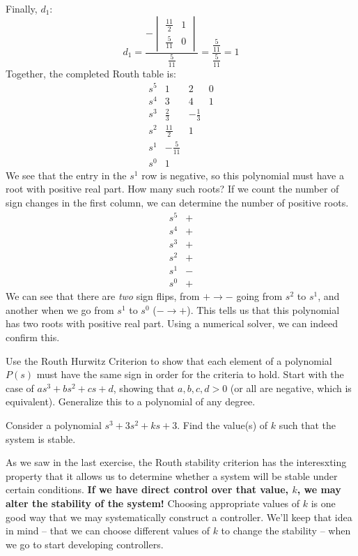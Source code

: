 \begin{example}
    Finally, $d_1$:
         $$d_1=\frac{-\begin{vmatrix}
        \frac{11}{2}&1\\\frac{5}{11}&0
    \end{vmatrix}}{\frac{5}{11}}=\frac{\frac{5}{11}}{\frac{5}{11}}=1$$
Together, the completed Routh table is:
    $$
    \begin{array}{lccc}
         s^5&1&2&0  \\
         s^4&3&4&1\\
         s^3&\frac{2}{3}&-\frac{1}{3}\\
         s^2&\frac{11}{2}&1\\
         s^1&-\frac{5}{11}\\
         s^0&1
    \end{array}
    $$
We see that the entry in the $s^1$ row is negative, so this polynomial must have a root with positive real part. How many such roots? If we count the number of sign changes in the first column, we can determine the number of positive roots.
    $$
    \begin{array}{lc}
         s^5&+ \\
         s^4&+\\
         s^3&+\\
         s^2&+\\
         s^1&-\\
         s^0&+
    \end{array}
    $$
    We can see that there are \textit{two} sign flips, from $+\rightarrow-$ going from $s^2$ to $s^1$, and another when we go from $s^1$ to $s^0$ ($-\rightarrow+$). This tells us that this polynomial has two roots with positive real part. Using a numerical solver, we can indeed confirm this.
\end{example}
\begin{exercise}
Use the Routh Hurwitz Criterion to show that each element of a polynomial $P(s)$ must have the same sign in order for the criteria to hold. Start with the case of $as^3+bs^2+cs+d$, showing that $a,b,c,d>0$ (or all are negative, which is equivalent). Generalize this to a polynomial of any degree.
\end{exercise}
\begin{exercise}
    Consider a polynomial $s^3+3s^2+ks+3$. Find the value(s) of $k$ such that the system is stable.
\end{exercise}

As we saw in the last exercise, the Routh stability criterion has the interesxting property that it allows us to determine whether a system will be stable under certain conditions. \textbf{If we have direct control over that value, $k$, we may alter the stability of the system!} Choosing appropriate values of $k$ is one good way that we may systematically construct a controller. We'll keep that idea in mind -- that we can choose different values of $k$ to change the stability -- when we go to start developing controllers.

